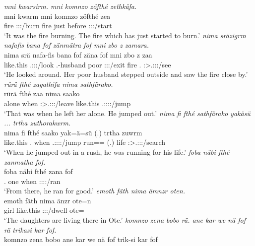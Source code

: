\begin{exe}
	\emph{mni kwarsirm. mni komnzo zöfthé zethkäfa.}\\
	\gll mni kwarm mni komnzo zöfthé zea\\
	fire \Sg:\Sbj:\Pst:\Dur/burn fire just before \Sg:\Sbj:\Pst:\Pfv/start\\
	\trans `It was the fire burning. The fire which has just started to burn.'
	\emph{nima sräzigrm nafafis bana fof zänmätra fof mni zbo z zamara.}\\
	\gll nima srä nafa-fis bana fof zäna fof mni zbo z zaa\\
	{like.this} \Tsg.\Masc:\Sbj:\Irr:\Pfv/look \Third.\Poss-husband poor {\Emph} \Sg:\Sbj:\Pst:\Pfv/exit {\Emph} fire \Prox.{\All} {\Iam} \Sg:\Sbj>\Tsg.\F:\Obj:\Pst:\Pfv/see\\
	\trans `He looked around. Her poor husband stepped outside and saw the fire close by.'
\newpage 	
{}
	\emph{rürä fthé zagathifa nima sathfärako.}\\
	\gll rürä fthé zaa nima saako\\
	alone when \Sg:\Sbj>\Tsg.\F:\Obj:\Pst:\Pfv/leave {like.this} \Tsg.\Masc:\Sbj:\Pst:\Pfv:\Andat/jump\\
	\trans `That was when he left her alone. He jumped out.'
	\emph{nima fi fthé sathfärako yakäsü ... trtha zuthorakwrm.}\\
	\gll nima fi fthé saako yak=ä=sü (.) trtha zuwrm\\
	{like.this} \Third.{\Abs} when \Tsg.\Masc:\Sbj:\Pst:\Pfv:\Andat/jump run=\Assoc=\Etc{} (.) life \Sg:\Sbj>\Tsg.\F:\Obj:\Pst:\Dur/search\\
	\trans `When he jumped out in a rush, he was running for his life.'
	\emph{foba näbi fthé zanmatha fof.}\\
	\gll foba näbi fthé zana fof\\
	\Dist.{\Abl} one when \Sg:\Sbj:\Pst:\Pfv:\Venit/ran \Emph\\
	\trans `From there, he ran for good.'
	\emph{emoth fäth nima ämnzr oten.}\\
	\gll emoth fäth nima änzr ote=n\\
	girl \Dim{} {like.this} \Stpl:\Sbj:\Nonpast:\Ipfv/dwell ote={\Loc}\\
	\trans `The daughters are living there in Ote.'
	\emph{komnzo zena bobo rä. ane kar we nä fof rä trikasi kar fof.}\\
	\gll komnzo zena bobo  ane kar we nä fof  trik-si kar fof\\

\end{exe}
